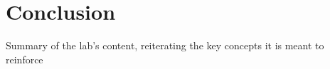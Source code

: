 \section{Conclusion}

Summary of the lab's content, reiterating the key concepts it is meant to reinforce
